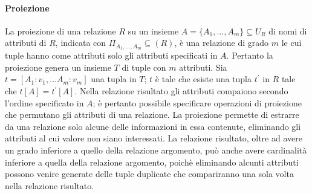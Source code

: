 \paragraph{Proiezione}%
\label{par:Proiezione}
La proiezione di una relazione $R$ su un insieme $A=\{A_1,\dots,A_m\}\subseteq
U_R$ di nomi di attributi di $R$, indicata con $\Pi_{A_1,\dots,A_m}\subseteq
(R)$, è una relazione di grado $m$ le cui tuple hanno come attributi solo gli
attributi specificati in $A$.
Pertanto la proiezione genera un insieme $T$ di tuple con $m$ attributi.
Sia $t=[A_1:v_1,\dots A_m:v_m]$ una tupla in $T$; $t$ è tale che esiste una
tupla $t^\prime$ in $R$ tale che $t[A]=t^\prime[A]$.
Nella relazione risultato gli attributi compaiono secondo l'ordine specificato
in $A$; è pertanto possibile specificare operazioni di proiezione che permutano
gli attributi di una relazione.
La proiezione permette di estrarre da una relazione solo alcune delle
informazioni in essa contenute, eliminando gli attributi al cui valore non siano
interessati.
La relazione risultato, oltre ad avere un grado inferiore a quello della
relazione argomento, può anche avere cardinalità inferiore a quella della
relazione argomento, poichè eliminando alcunti attributi possono venire generate
delle tuple duplicate che compariranno una sola volta nella relazione risultato.
